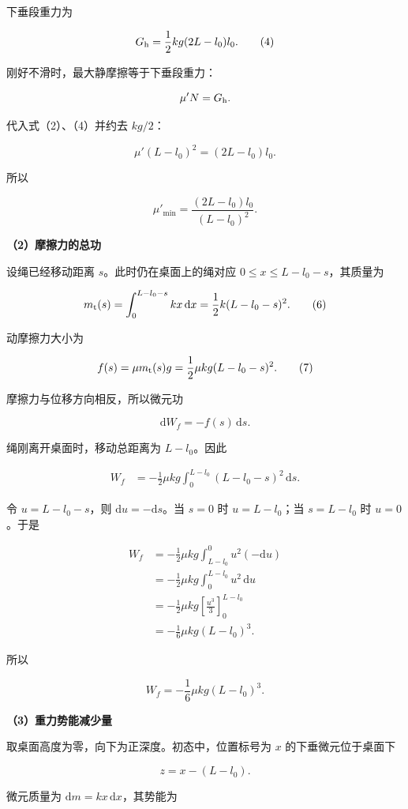 \documentclass[12pt,a4paper,UTF8]{ctexart}
\begin{document}
下垂段重力为

\[
G_{\rm h}
=\frac12kg(2L-l_0)l_0.
\tag{4}
\]

刚好不滑时，最大静摩擦等于下垂段重力：

\[
\mu'N=G_{\rm h}.
\]

代入式（2）、（4）并约去 \(kg/2\)：

\[
\mu'(L-l_0)^2=(2L-l_0)l_0.
\]

所以

\[
\boxed{\mu'_{\min}
=\frac{(2L-l_0)l_0}{(L-l_0)^2}}.
\tag{5}
\]

\textbf{（2）摩擦力的总功}

设绳已经移动距离 \(s\)。此时仍在桌面上的绳对应
\(0\le x\le L-l_0-s\)，其质量为

\[
m_{\rm t}(s)
=\int_0^{L-l_0-s}kx\,\mathrm dx
=\frac12k(L-l_0-s)^2.
\tag{6}
\]

动摩擦力大小为

\[
f(s)=\mu m_{\rm t}(s)g
=\frac12\mu kg(L-l_0-s)^2.
\tag{7}
\]

摩擦力与位移方向相反，所以微元功

\[
\mathrm dW_f=-f(s)\,\mathrm ds.
\]

绳刚离开桌面时，移动总距离为 \(L-l_0\)。因此

\[
\begin{aligned}
W_f
&=-\frac12\mu kg
\int_0^{L-l_0}(L-l_0-s)^2\,\mathrm ds.
\end{aligned}
\]

令 \(u=L-l_0-s\)，则 \(\mathrm du=-\mathrm ds\)。当 \(s=0\) 时
\(u=L-l_0\)；当 \(s=L-l_0\) 时 \(u=0\)。于是

\[
\begin{aligned}
W_f
&=-\frac12\mu kg
\int_{L-l_0}^{0}u^2(-\mathrm du)\\
&=-\frac12\mu kg
\int_0^{L-l_0}u^2\,\mathrm du\\
&=-\frac12\mu kg
\left[\frac{u^3}{3}\right]_0^{L-l_0}\\
&=-\frac16\mu kg(L-l_0)^3.
\end{aligned}
\]

所以

\[
\boxed{W_f=-\frac16\mu kg(L-l_0)^3}.
\tag{8}
\]

\textbf{（3）重力势能减少量}

取桌面高度为零，向下为正深度。初态中，位置标号为 \(x\)
的下垂微元位于桌面下

\[
z=x-(L-l_0).
\]

微元质量为 \(\mathrm dm=kx\,\mathrm dx\)，其势能为
\end{document}
